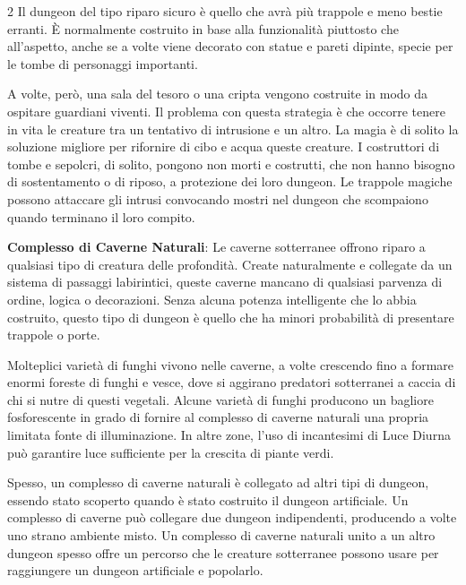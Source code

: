 \begin{multicols}{2}
Il dungeon del tipo riparo sicuro è quello che avrà più trappole e meno bestie erranti. È normalmente costruito in base alla funzionalità piuttosto che all'aspetto, anche se a volte viene decorato con statue e pareti dipinte, specie per le tombe di personaggi importanti.


A volte, però, una sala del tesoro o una cripta vengono costruite in modo da ospitare guardiani viventi. Il problema con questa strategia è che occorre tenere in vita le creature tra un tentativo di intrusione e un altro. La magia è di solito la soluzione migliore per rifornire di cibo e acqua queste creature. I costruttori di tombe e sepolcri, di solito, pongono non morti e costrutti, che non hanno bisogno di sostentamento o di riposo, a protezione dei loro dungeon. Le trappole magiche possono attaccare gli intrusi convocando mostri nel dungeon che scompaiono quando terminano il loro compito.

\textbf{Complesso di Caverne Naturali}: Le caverne sotterranee offrono riparo a qualsiasi tipo di creatura delle profondità. Create naturalmente e collegate da un sistema di passaggi labirintici, queste caverne mancano di qualsiasi parvenza di ordine, logica o decorazioni. Senza alcuna potenza intelligente che lo abbia costruito, questo tipo di dungeon è quello che ha minori probabilità di presentare trappole o porte.

Molteplici varietà di funghi vivono nelle caverne, a volte crescendo fino a formare enormi foreste di funghi e vesce, dove si aggirano predatori sotterranei a caccia di chi si nutre di questi vegetali. Alcune varietà di funghi producono un bagliore fosforescente in grado di fornire al complesso di caverne naturali una propria limitata fonte di illuminazione. In altre zone, l'uso di incantesimi di Luce Diurna può garantire luce sufficiente per la crescita di piante verdi.

Spesso, un complesso di caverne naturali è collegato ad altri tipi di dungeon, essendo stato scoperto quando è stato costruito il dungeon artificiale. Un complesso di caverne può collegare due dungeon indipendenti, producendo a volte uno strano ambiente misto. Un complesso di caverne naturali unito a un altro dungeon spesso offre un percorso che le creature sotterranee possono usare per raggiungere un dungeon artificiale e popolarlo.


\end{multicols}
